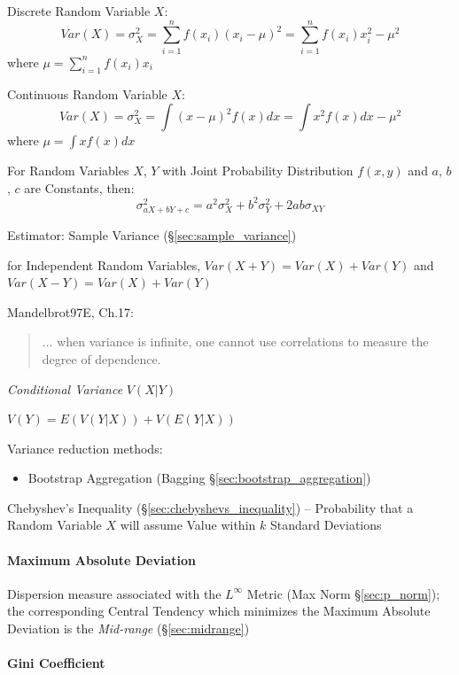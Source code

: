 Discrete Random Variable $X$:
\[
  Var(X) = \sigma_X^2 = \sum_{i=1}^n f(x_i) (x_i - \mu)^2 = \sum_{i=1}^n
  f(x_i) x_i^2 - \mu^2
\]
where $\mu = \sum_{i=1}^n f(x_i) x_i$

Continuous Random Variable $X$:
\[
  Var(X) = \sigma_X^2 = \int (x - \mu)^2 f(x) dx = \int x^2 f(x) dx -
  \mu^2
\]
where $\mu = \int x f(x) dx$

For Random Variables $X$, $Y$ with Joint Probability Distribution
$f(x,y)$ and $a$, $b$, $c$ are Constants, then:
\[
  \sigma^2_{a X + b Y + c} = a^2 \sigma^2_X + b^2 \sigma^2_Y + 2ab
  \sigma_{X Y}
\]

\fist Estimator: Sample Variance (\S\ref{sec:sample_variance})

for Independent Random Variables, $Var(X + Y) = Var(X) + Var(Y)$ and
$Var(X - Y) = Var(X) + Var(Y)$

Mandelbrot97E, Ch.17:
\begin{quote}
  ... when variance is infinite, one cannot use correlations to measure the
  degree of dependence.
\end{quote}

\emph{Conditional Variance} $V(X|Y)$

$V(Y) = E(V(Y|X)) + V(E(Y|X))$

Variance reduction methods:
\begin{itemize}
  \item Bootstrap Aggregation (Bagging \S\ref{sec:bootstrap_aggregation})
\end{itemize}

Chebyshev's Inequality (\S\ref{sec:chebyshevs_inequality}) -- Probability that a
Random Variable $X$ will assume Value within $k$ Standard Deviations



\paragraph{Maximum Absolute Deviation}
\label{sec:maximum_absolute_deviation}\hfill

Dispersion measure associated with the $L^\infty$ Metric (Max Norm
\S\ref{sec:p_norm}); the corresponding Central Tendency which minimizes the
Maximum Absolute Deviation is the \emph{Mid-range} (\S\ref{sec:midrange})



\paragraph{Gini Coefficient}\label{sec:gini_coefficient}\hfill

